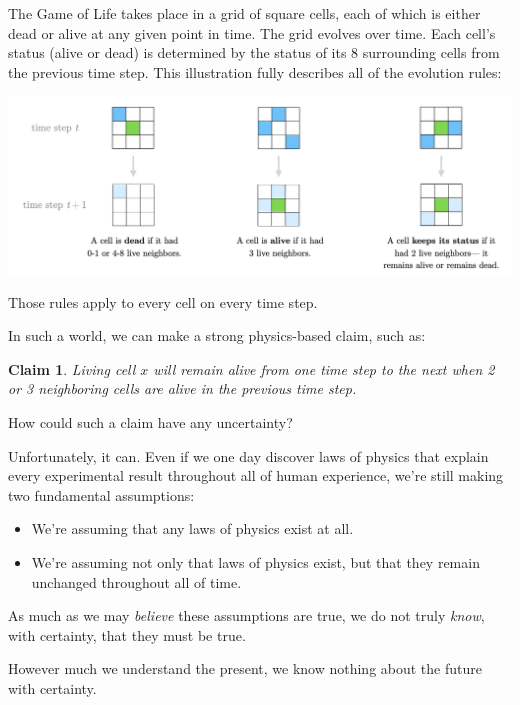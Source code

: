 \documentclass[9pt, twoside]{book}
\newtheorem*{claim}{Claim}
\theoremstyle{argtstyle}
\begin{document}
The Game of Life takes place in a grid of square cells, each of which is either
dead or alive at any given point in time. The grid evolves over
time. Each cell's status (alive or dead) is determined by the status of its 8
surrounding cells from the previous time step. This illustration fully
describes all of the evolution rules:
\begin{center}
\includegraphics[width=\textwidth]{gameoflife.png}
\end{center}
Those rules apply to every cell on every time step.

In such a world, we can make a strong physics-based claim, such as:
\begin{claim}
    Living cell $x$ will remain alive from one time step to the next when 2 or 3
    neighboring cells are alive in the previous time step.
\end{claim}

How could such a claim have any uncertainty?

Unfortunately, it can. Even if we one day discover laws of physics that
explain every experimental result throughout all of human
experience, we're still making two fundamental assumptions:
\begin{itemize}
    \item We're assuming that any laws of physics exist at all.
    \item We're assuming not only that laws of physics exist, but that they
        remain unchanged throughout all of time.
\end{itemize}
As much as we may {\em believe} these assumptions are true, we do not truly {\em
know}, with certainty, that they must be true.

However much we understand the present, we know nothing about
the future with certainty.
\end{document}
